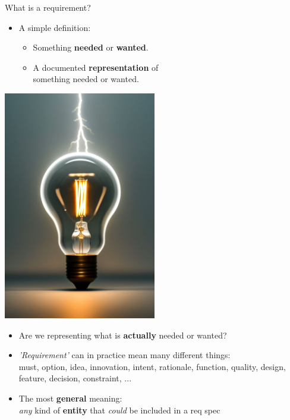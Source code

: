 
\begin{Slide}{What is a requirement?}

\begin{minipage}[t]{0.65\textwidth}
\begin{itemize}
\item A simple definition:
\begin{itemize}
\item Something \textbf{needed} or \textbf{wanted}.
\item A documented \textbf{representation} of\\something needed or wanted.
\end{itemize}
\end{itemize}
\end{minipage}%
\begin{minipage}[t]{0.35\textwidth}
\vspace{-1em}\hfill\includegraphics[width=0.5\textwidth]{../img/light-bulb}
\end{minipage}%

\begin{itemize}
\item Are we representing what is \textbf{actually} needed or wanted? 

\item \textit{'Requirement'} can in practice mean many different things:\\
  must, option, idea, innovation, intent, rationale, function, quality, design, feature, decision, constraint, ...

\item The most \textbf{general} meaning:\\
  \textit{any} kind of \textbf{entity} that \textit{could} be included in a req spec

\end{itemize}
\end{Slide}